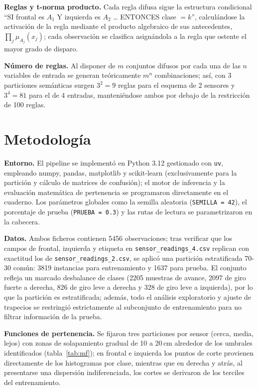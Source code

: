 \documentclass[11pt,letterpaper]{article}
\begin{document}
\textbf{Reglas y t-norma producto.} Cada regla difusa sigue la estructura condicional ``SI frontal es $A_1$ Y izquierda es $A_2$ \dots{} ENTONCES clase $=k$'', calculándose la activación de la regla mediante el producto algebraico de sus antecedentes, $\prod_j \mu_{A_j}(x_j)$; cada observación se clasifica asignándola a la regla que ostente el mayor grado de disparo.

\textbf{Número de reglas.} Al disponer de $m$ conjuntos difusos por cada una de las $n$ variables de entrada se generan teóricamente $m^n$ combinaciones; así, con 3 particiones semánticas surgen $3^2=9$ reglas para el esquema de 2 sensores y $3^4=81$ para el de 4 entradas, manteniéndose ambos por debajo de la restricción de 100 reglas.

\section{Metodología}

\textbf{Entorno.} El pipeline se implementó en Python 3.12 gestionado con \texttt{uv}, empleando numpy, pandas, matplotlib y scikit-learn (exclusivamente para la partición y cálculo de matrices de confusión); el motor de inferencia y la evaluación matemática de pertenencia se programaron directamente en el cuaderno. Los parámetros globales como la semilla aleatoria (\texttt{SEMILLA = 42}), el porcentaje de prueba (\texttt{PRUEBA = 0.3}) y las rutas de lectura se parametrizaron en la cabecera.

\textbf{Datos.} Ambos ficheros contienen 5456 observaciones; tras verificar que los campos de frontal, izquierda y etiqueta en \texttt{sensor\_readings\_4.csv} replican con exactitud los de \texttt{sensor\_readings\_2.csv}, se aplicó una partición estratificada 70-30 común: 3819 instancias para entrenamiento y 1637 para prueba. El conjunto refleja un marcado desbalance de clases (2205 muestras de avance, 2097 de giro fuerte a derecha, 826 de giro leve a derecha y 328 de giro leve a izquierda), por lo que la partición es estratificada; además, todo el análisis exploratorio y ajuste de trapecios se restringió estrictamente al subconjunto de entrenamiento para no filtrar información de la prueba.

\textbf{Funciones de pertenencia.} Se fijaron tres particiones por sensor (cerca, media, lejos) con zonas de solapamiento gradual de 10 a 20\,cm alrededor de los umbrales identificados (tabla~\ref{tab:mf}); en frontal e izquierda los puntos de corte provienen directamente de los histogramas por clase, mientras que en derecha y atrás, al presentarse una dispersión indiferenciada, los cortes se derivaron de los terciles del entrenamiento.
\end{document}
